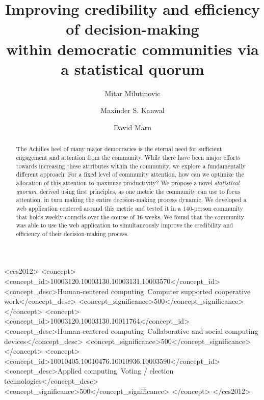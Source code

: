 \documentclass[format=acmsmall, review=true, screen=true, anonymous=true]{acmart}
\begin{document}
\title[Improving credibility and efficiency of decision-making]{Improving credibility and efficiency of decision-making \\ within democratic communities via a statistical quorum}

\author{Mitar Milutinovic}
\author{Maxinder S. Kanwal}
\author{David Marn}


\begin{abstract}
The Achilles heel of many major democracies is the eternal need for sufficient engagement and attention from the community.
While there have been major efforts towards increasing these attributes within the community, we explore a fundamentally
different approach: For a fixed level of community attention, how can we optimize the allocation of this attention to
maximize productivity?
We propose a novel \textit{statistical quorum}, derived using first principles, as one metric the community can use to
focus attention, in turn making the entire decision-making process dynamic.
We developed a web application centered around this metric and tested it in a 140-person community that holds weekly
councils over the course of 16 weeks.
We found that the community was able to use the web application to simultaneously improve the credibility and efficiency
of their decision-making process.
\end{abstract}


%
%
\begin{CCSXML}
<ccs2012>
<concept>
<concept_id>10003120.10003130.10003131.10003570</concept_id>
<concept_desc>Human-centered computing~Computer supported cooperative work</concept_desc>
<concept_significance>500</concept_significance>
</concept>
<concept>
<concept_id>10003120.10003130.10011764</concept_id>
<concept_desc>Human-centered computing~Collaborative and social computing devices</concept_desc>
<concept_significance>500</concept_significance>
</concept>
<concept>
<concept_id>10010405.10010476.10010936.10003590</concept_id>
<concept_desc>Applied computing~Voting / election technologies</concept_desc>
<concept_significance>500</concept_significance>
</concept>
</ccs2012>
\end{CCSXML}
\end{document}
